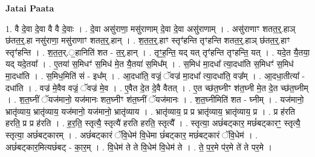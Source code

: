 \documentclass[17pt]{extarticle}
\begin{document}
\textbf{Jatai Paata} \newline

1. वै दे॒वा दे॒वा वै वै दे॒वाः । . दे॒वा असु॑राणा॒ मसु॑राणाम् दे॒वा दे॒वा असु॑राणाम् । . असु॑राणाꣳ शतत॒र्॒.हाञ् छ॑तत॒र्॒.हा नसु॑राणा॒ मसु॑राणाꣳ शतत॒र्॒.हान् । . श॒त॒त॒र्॒.हाꣳ स्तृꣳ॑हन्ति तृꣳहन्ति शतत॒र्॒.हाञ् छ॑तत॒र्॒.हाꣳ स्तृꣳ॑हन्ति । . श॒त॒त॒र्.॒हानिति॑ शत - त॒र्॒.हान् । . तृꣳ॒॒ह॒न्ति॒ यद् यत् तृꣳ॑हन्ति तृꣳहन्ति॒ यत् । . यदे॒त यै॒तया॒ यद् यदे॒तया᳚ । . ए॒तया॑ स॒मिधꣳ॑ स॒मिध॑ मे॒त यै॒तया॑ स॒मिध᳚म् । . स॒मिध॑ मा॒दधा᳚ त्या॒दधा॑ति स॒मिधꣳ॑ स॒मिध॑ मा॒दधा॑ति । . स॒मिध॒मिति॑ सं - इध᳚म् । . आ॒दधा॑ति॒ वज्रं॒ ॅवज्र॑ मा॒दधा᳚ त्या॒दधा॑ति॒ वज्र᳚म् । . आ॒दधा॒तीत्या᳚ - दधा॑ति । . वज्र॑ मे॒वैव वज्रं॒ ॅवज्र॑ मे॒व । . ए॒वैत दे॒त दे॒वै वैतत् । . ए॒त च्छ॑त॒घ्नीꣳ श॑त॒घ्नी मे॒त दे॒त च्छ॑त॒घ्नीम् । . श॒त॒घ्नीं ॅयज॑मानो॒ यज॑मानः शत॒घ्नीꣳ श॑त॒घ्नीं ॅयज॑मानः । . श॒त॒घ्नीमिति॑ शत - घ्नीम् । . यज॑मानो॒ भ्रातृ॑व्याय॒ भ्रातृ॑व्याय॒ यज॑मानो॒ यज॑मानो॒ भ्रातृ॑व्याय । . भ्रातृ॑व्याय॒ प्र प्र भ्रातृ॑व्याय॒ भ्रातृ॑व्याय॒ प्र । . प्र ह॑रति हरति॒ प्र प्र ह॑रति । . ह॒र॒ति॒ स्तृत्यै॒ स्तृत्यै॑ हरति हरति॒ स्तृत्यै᳚ । . स्तृत्या॒ अछं॑बट्कार॒ मछं॑बट्कारꣳ॒॒ स्तृत्यै॒ स्तृत्या॒ अछं॑बट्कारम् । . अछं॑बट्कारं ॅवि॒धेम॑ वि॒धेमा छं॑बट्कार॒ मछं॑बट्कारं ॅवि॒धेम॑ । . अछं॑बट्कार॒मित्यछं॑बट् - का॒र॒म् । . वि॒धेम॑ ते ते वि॒धेम॑ वि॒धेम॑ ते । . ते॒ प॒र॒मे प॑र॒मे ते॑ ते पर॒मे । \newline
\end{document}
